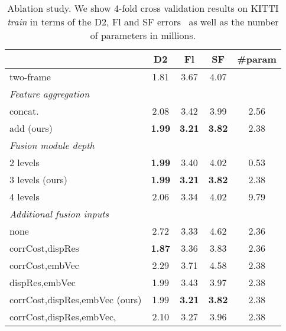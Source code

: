 \documentclass[10pt,twocolumn,letterpaper]{article}
\begin{document}
\begin{table}
\caption{Ablation study. We show 4-fold cross validation results on KITTI \emph{train} in terms of the D2, Fl and SF errors~\cite{Menze2015_KITTI} as well as the number of parameters in millions.}
\label{tab:ablations}
\begin{center}
{\setlength\tabcolsep{2.7pt}
\begin{tabular}{lcccc}
\toprule
& D2 & Fl & SF & \#param\!
\\
\midrule
\midrule
two-frame & 1.81 & 3.67 & 4.07
\\
\midrule
\midrule
\multicolumn{4}{l}{\emph{Feature aggregation}}
\\
\midrule
concat. & 2.08 & 3.42 & 3.99 & 2.56
\\
add (ours) & \textbf{1.99} & \textbf{3.21} & \textbf{3.82} & 2.38
\\
\midrule
\midrule
\multicolumn{4}{l}{\emph{Fusion module depth}}
\\
\midrule
2 levels & \textbf{1.99} & 3.40 & 4.02 & 0.53
\\
3 levels (ours) & \textbf{1.99} & \textbf{3.21} & \textbf{3.82} & 2.38
\\
4 levels & 2.06 & 3.34 & 4.02 & 9.79
\\
\midrule
\midrule
\multicolumn{4}{l}{\emph{Additional fusion inputs}}
\\
\midrule
none & 2.72 & 3.33 & 4.62 & 2.36
\\
corrCost,dispRes & \textbf{1.87} & 3.36 & 3.83 & 2.36
\\
corrCost,embVec & 2.29 & 3.71 & 4.58 & 2.38
\\
dispRes,embVec & 1.99 & 3.43 & 3.97 & 2.38
\\
corrCost,dispRes,embVec (ours) & 1.99 & \textbf{3.21} & \textbf{3.82} & 2.38
\\
corrCost,dispRes,embVec,  & 2.10 & 3.27 & 3.96 & 2.38
\\
\bottomrule
\end{tabular}
}
\end{center}
\end{table}
\end{document}
